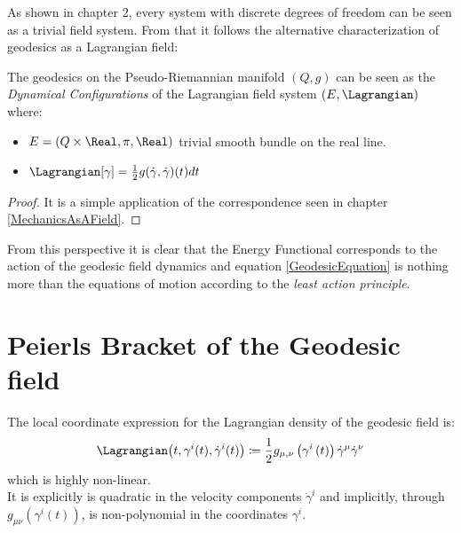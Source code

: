\documentclass[Main]{subfiles}
\begin{document}
	As shown in chapter 2, every system with discrete degrees of freedom can be seen as a trivial field system.
	From that it follows the alternative characterization of geodesics as a Lagrangian field:
	\begin{corollary}
		The geodesics on the Pseudo-Riemannian manifold $(Q,g)$ can be seen as the \emph{Dynamical Configurations} of the Lagrangian field system $(E,\Lagrangian)$ where:
		\begin{itemize}
			\item $E=(Q\times\Real, \pi, \Real)$ trivial smooth bundle on the real line.
			\item $\Lagrangian[\gamma] = \frac{1}{2} g(\dot{\gamma},\dot{\gamma})(t) dt$
		\end{itemize}
	\end{corollary}
	\begin{proof}
		It is a simple application of the correspondence seen in chapter \ref{MechanicsAsAField}.
	\end{proof}
	
	From this perspective it is clear that the Energy Functional corresponds to the action of the geodesic field dynamics and equation \ref{GeodesicEquation} is nothing more than the equations of motion according to the \emph{least action principle}.



\section{Peierls Bracket of the Geodesic field}
	The local coordinate expression for the Lagrangian density of the geodesic field is:
	\begin{equation}
		\Lagrangian\big(t,\gamma^i(t), \dot{\gamma}^i(t) \big)\coloneqq \frac{1}{2}g_{\mu,\nu}\left(\gamma^i\left(t\right)\right)\dot{\gamma}^\mu \dot{\gamma}^\nu
	\end{equation}		
	which is highly non-linear. \\
	It is explicitly is quadratic in the velocity components $\dot{\gamma}^i$ and implicitly, through $g_{\mu\nu}(\gamma^i(t))$, is non-polynomial in the %
	coordinates $\gamma^i$.
	
\end{document}
